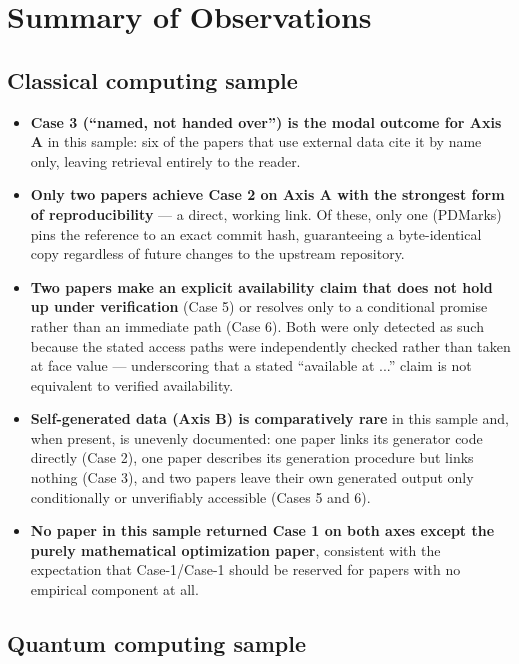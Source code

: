 \section{Summary of Observations}

\subsection{Classical computing sample}

\begin{itemize}[leftmargin=1.5em]
    \item \textbf{Case 3 (``named, not handed over'') is the modal outcome for Axis
    A} in this sample: six of the papers that use external data cite it by name only,
    leaving retrieval entirely to the reader.
    \item \textbf{Only two papers achieve Case 2 on Axis A with the strongest form of
    reproducibility} --- a direct, working link. Of these, only one (PDMarks) pins the
    reference to an exact commit hash, guaranteeing a byte-identical copy regardless of
    future changes to the upstream repository.
    \item \textbf{Two papers make an explicit availability claim that does not hold up
    under verification} (Case 5) or resolves only to a conditional promise rather than
    an immediate path (Case 6). Both were only detected as such because the stated
    access paths were independently checked rather than taken at face value ---
    underscoring that a stated ``available at ...'' claim is not equivalent to verified
    availability.
    \item \textbf{Self-generated data (Axis B) is comparatively rare} in this sample
    and, when present, is unevenly documented: one paper links its generator code
    directly (Case 2), one paper describes its generation procedure but links nothing
    (Case 3), and two papers leave their own generated output only conditionally or
    unverifiably accessible (Cases 5 and 6).
    \item \textbf{No paper in this sample returned Case 1 on both axes except the
    purely mathematical optimization paper}, consistent with the expectation that
    Case-1/Case-1 should be reserved for papers with no empirical component at all.
\end{itemize}

\subsection{Quantum computing sample}

